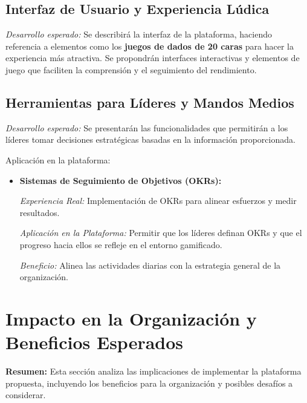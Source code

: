 \documentclass[journal]{IEEEtran}
\begin{document}
\subsection{\textbf{Interfaz de Usuario y Experiencia Lúdica}}

\textit{Desarrollo esperado:} Se describirá la interfaz de la plataforma, haciendo referencia a elementos como los \textbf{juegos de dados de 20 caras} para hacer la experiencia más atractiva. Se propondrán interfaces interactivas y elementos de juego que faciliten la comprensión y el seguimiento del rendimiento.

\subsection{\textbf{Herramientas para Líderes y Mandos Medios}}

\textit{Desarrollo esperado:} Se presentarán las funcionalidades que permitirán a los líderes tomar decisiones estratégicas basadas en la información proporcionada.

Aplicación en la plataforma:

\begin{itemize}
    \item \textbf{Sistemas de Seguimiento de Objetivos (OKRs):}
    
    \textit{Experiencia Real:} Implementación de OKRs para alinear esfuerzos y medir resultados.
    
    \textit{Aplicación en la Plataforma:} Permitir que los líderes definan OKRs y que el progreso hacia ellos se refleje en el entorno gamificado.
    
    \textit{Beneficio:} Alinea las actividades diarias con la estrategia general de la organización.
\end{itemize}

\section{\textbf{\Large Impacto en la Organización y Beneficios Esperados}}

\textbf{Resumen:} Esta sección analiza las implicaciones de implementar la plataforma propuesta, incluyendo los beneficios para la organización y posibles desafíos a considerar.

\end{document}
